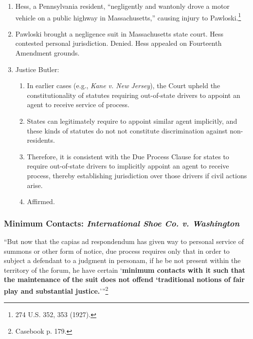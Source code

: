 \begin{enumerate}
    \item Hess, a Pennsylvania resident, ``negligently and wantonly drove a 
    motor vehicle on a public highway in Massachusetts,'' causing injury to 
    Pawloski.\footnote{274 U.S. 352, 353 (1927).}
    \item Pawloski brought a negligence suit in Massachusetts state court.  
    Hess contested personal jurisdiction. Denied. Hess appealed on Fourteenth 
    Amendment grounds.
    \item Justice Butler:
    \begin{enumerate}
        \item In earlier cases (e.g., \emph{Kane v. New Jersey}), the Court 
        upheld the constitutionality of statutes requiring out-of-state 
        drivers to appoint an agent to receive service of process.
        \item States can legitimately require to appoint similar agent 
        implicitly, and these kinds of statutes do not not constitute 
        discrimination against non-residents.
        \item Therefore, it is consistent with the Due Process Clause for 
        states to require out-of-state drivers to implicitly appoint an agent 
        to receive process, thereby establishing jurisdiction over those 
        drivers if civil actions arise.
        \item Affirmed.
    \end{enumerate}
\end{enumerate}

\subsubsection{Minimum Contacts: \emph{International Shoe Co. v. Washington}}

\enquote{But now that the capias ad respondendum has given way to personal 
service of summons or other form of notice, due process requires only that in 
order to subject a defendant to a judgment in personam, if he be not present 
within the territory of the forum, he have certain \enquote{\textbf{minimum 
contacts with it such that the maintenance of the suit does not offend 
`traditional notions of fair play and substantial 
justice.}}}\footnote{Casebook p. 179.}

